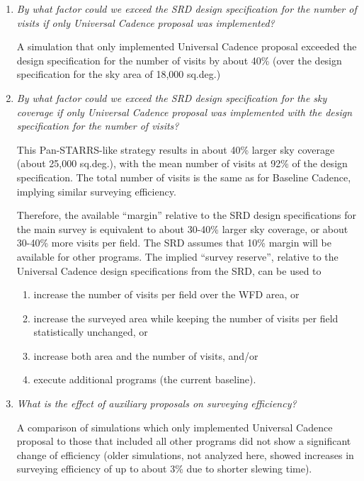 \begin{enumerate}
\item {\it By what factor could we exceed the SRD design specification for the number
of visits if only Universal Cadence proposal was implemented?}

A simulation that only implemented Universal Cadence proposal exceeded
the design specification for the number of visits by about 40\% (over the design
specification for the sky area of 18,000 sq.deg.)

\item {\it By what factor could we exceed the SRD design specification for the
sky coverage if only Universal Cadence proposal was implemented
with the design specification for the number of visits? }

This Pan-STARRS-like strategy results in about 40\% larger sky coverage
(about 25,000 sq.deg.), with the mean number of visits at 92\% of the design
specification. The total number of visits is the same as for Baseline
Cadence, implying similar surveying efficiency.

Therefore, the available ``margin'' relative to the SRD design specifications
for the main survey is equivalent to about 30-40\% larger sky coverage, or
about 30-40\% more visits per field. The SRD assumes that 10\% margin
will be available for other programs. The implied ``survey reserve'',
relative to the Universal Cadence design specifications from the SRD, can
be used to
\begin{enumerate}
\item increase the number of visits per field over the WFD area,  or
\item increase the surveyed area while keeping the number of visits per field statistically unchanged, or
\item increase both area and the number of visits, and/or
\item execute additional programs (the current baseline).
\end{enumerate}


\item {\it What is the effect of auxiliary proposals on surveying efficiency?}

A comparison of simulations which only implemented Universal Cadence
proposal to those that included all other programs did not show a significant
change of efficiency (older simulations, not analyzed here, showed
increases in surveying efficiency of up to about 3\% due to shorter slewing
time).



\end{enumerate}
